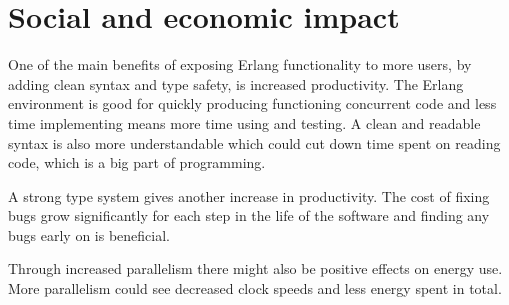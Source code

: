 \section{Social and economic impact}

One of the main benefits of exposing Erlang functionality to more users, by adding clean syntax and type safety, is increased productivity. The Erlang environment is good for quickly producing functioning concurrent code and less time implementing means more time using and testing. A clean and readable syntax is also more understandable which could cut down time spent on reading code, which is a big part of programming.
 
A strong type system gives another increase in productivity. The cost of fixing bugs grow significantly for each step in the life of the software and finding any bugs early on is beneficial.

Through increased parallelism there might also be positive effects on energy use. More parallelism could see decreased clock speeds and less energy spent in total.